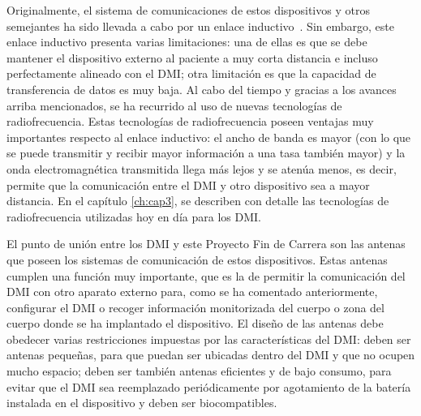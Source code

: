Originalmente, el sistema de comunicaciones de estos dispositivos y otros semejantes ha sido llevada a cabo por un enlace inductivo~\cite{webster,cavuoto}. Sin embargo, este enlace inductivo presenta varias limitaciones: una de ellas es que se debe mantener el dispositivo externo al paciente a muy corta distancia e incluso perfectamente alineado con el DMI; otra limitación es que la capacidad de transferencia de datos es muy baja. Al cabo del tiempo y gracias a los avances arriba mencionados, se ha recurrido al uso de nuevas tecnologías de radiofrecuencia. Estas tecnologías de radiofrecuencia poseen ventajas muy importantes respecto al enlace inductivo: el ancho de banda es mayor (con lo que se puede transmitir y recibir mayor información a una tasa también mayor) y la onda electromagnética transmitida llega más lejos y se atenúa menos, es decir, permite que la comunicación entre el DMI y otro dispositivo sea a mayor distancia. En el capítulo \ref{ch:cap3}, se describen con detalle las tecnologías de radiofrecuencia utilizadas hoy en día para los DMI.

El punto de unión entre los DMI y este Proyecto Fin de Carrera son las antenas que poseen los sistemas de comunicación de estos dispositivos. Estas antenas cumplen una función muy importante, que es la de permitir la comunicación del DMI con otro aparato externo para, como se ha comentado anteriormente, configurar el DMI o recoger información monitorizada del cuerpo o zona del cuerpo donde se ha implantado el dispositivo. El diseño de las antenas debe obedecer varias restricciones impuestas por las características del DMI: deben ser antenas pequeñas, para que puedan ser ubicadas dentro del DMI y que no ocupen mucho espacio; deben ser también antenas eficientes y de bajo consumo, para evitar que el DMI sea reemplazado periódicamente por agotamiento de la batería instalada en el dispositivo y deben ser biocompatibles.

